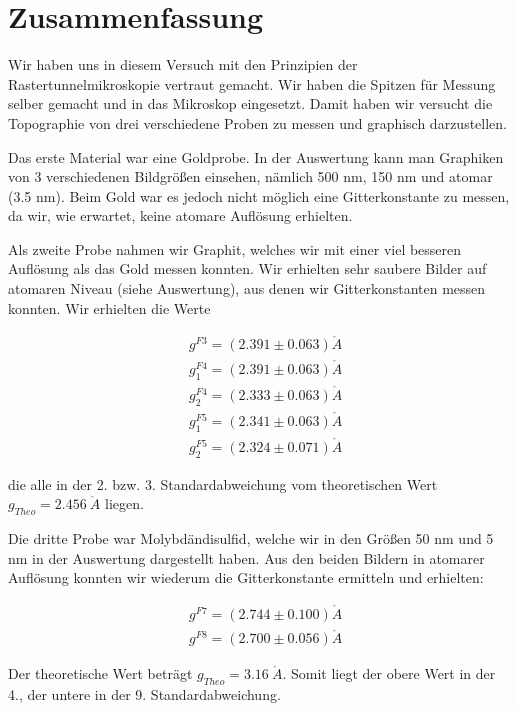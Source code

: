 \section{Zusammenfassung}

Wir haben uns in diesem Versuch mit den Prinzipien der Rastertunnelmikroskopie vertraut gemacht. Wir haben die Spitzen für Messung selber gemacht und in das Mikroskop eingesetzt. Damit haben wir versucht die Topographie von drei verschiedene Proben zu messen und graphisch darzustellen.

Das erste Material war eine Goldprobe. In der Auswertung kann man Graphiken von 3 verschiedenen Bildgrößen einsehen, nämlich 500 nm, 150 nm und atomar (3.5 nm). Beim Gold war es jedoch nicht möglich eine Gitterkonstante zu messen, da wir, wie erwartet, keine atomare Auflösung erhielten.

Als zweite Probe nahmen wir Graphit, welches wir mit einer viel besseren Auflösung als das Gold messen konnten. Wir erhielten sehr saubere Bilder auf atomaren Niveau (siehe Auswertung), aus denen wir Gitterkonstanten messen konnten. Wir erhielten die Werte

\begin{align*}	
	&g^{F3} = (2.391 \pm 0.063) \mathring{A}\\
	&g^{F4}_1 = (2.391 \pm 0.063) \mathring{A}\\
	&g^{F4}_2 = (2.333 \pm 0.063) \mathring{A}\\
	&g^{F5}_1 = (2.341 \pm 0.063) \mathring{A}\\
	&g^{F5}_2 = (2.324 \pm 0.071) \mathring{A}
\end{align*}

die alle in der 2. bzw. 3. Standardabweichung vom theoretischen Wert $g_{Theo} = 2.456\ \mathring A$ liegen.

Die dritte Probe war Molybdändisulfid, welche wir in den Größen 50 nm und 5 nm in der Auswertung dargestellt haben. Aus den beiden Bildern in atomarer Auflösung konnten wir wiederum die Gitterkonstante ermitteln und erhielten:

\begin{align*}
	&g^{F7} = (2.744 \pm 0.100) \mathring{A}\\ 
	&g^{F8} = (2.700 \pm 0.056) \mathring{A}
\end{align*}

Der theoretische Wert beträgt $g_{Theo} = 3.16\ \mathring A$. Somit liegt der obere Wert in der 4., der untere in der 9. Standardabweichung.